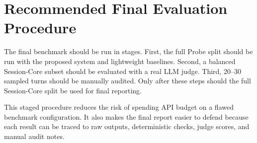 \section{Recommended Final Evaluation Procedure}

The final benchmark should be run in stages. First, the full Probe split should be run with the proposed system and lightweight baselines. Second, a balanced Session-Core subset should be evaluated with a real LLM judge. Third, 20--30 sampled turns should be manually audited. Only after these steps should the full Session-Core split be used for final reporting.

This staged procedure reduces the risk of spending API budget on a flawed benchmark configuration. It also makes the final report easier to defend because each result can be traced to raw outputs, deterministic checks, judge scores, and manual audit notes.
